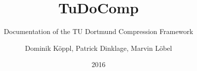 

\title{TuDoComp}
\subtitle{Documentation of the TU Dortmund Compression Framework}
\author{Dominik Köppl, Patrick Dinklage, Marvin Löbel}
\date{2016}




\begin{titlepage}
\maketitle
\end{titlepage}

\tableofcontents

\cleardoublepage
{}



